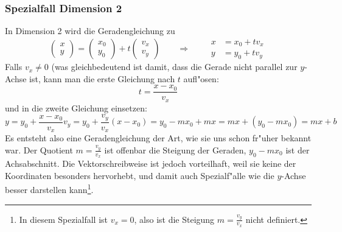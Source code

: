 \subsubsection{Spezialfall Dimension 2}
In Dimension 2 wird die Geradengleichung zu
\[
\begin{pmatrix}
x\\y
\end{pmatrix}
=
\begin{pmatrix}
x_0\\y_0
\end{pmatrix}
+t
\begin{pmatrix}
v_x\\v_y
\end{pmatrix}
\qquad
\Rightarrow
\qquad
\begin{aligned}
x&=x_0+tv_x\\
y&=y_0+tv_y
\end{aligned}
\]
Falls $v_x\ne 0$ (was gleichbedeutend ist damit, dass die Gerade
nicht parallel zur $y$-Achse ist, kann man die erste Gleichung nach
$t$ aufl"osen:
\[
t = \frac{x-x_0}{v_x}
\]
und in die zweite Gleichung einsetzen:
\[
y=y_0+
\frac{x-x_0}{v_x}v_y
=
y_0+\frac{v_y}{v_x}(x-x_0)
=
y_0-mx_0 +mx
=
mx+(y_0-mx_0)=mx+b
\]
Es entsteht also eine Geradengleichung der Art, wie sie uns schon fr"uher
bekannt war.
Der Quotient $m=\frac{v_y}{v_x}$
ist offenbar die Steigung der Geraden, $y_0-mx_0$ ist der Achsabschnitt.
Die Vektorschreibweise ist jedoch vorteilhaft, weil sie keine der
Koordinaten besonders hervorhebt, und damit auch Spezialf"alle wie
die $y$-Achse besser darstellen kann\footnote{In diesem Spezialfall ist
$v_x=0$, also ist die Steigung $m=\frac{v_y}{v_x}$ nicht definiert.}.

